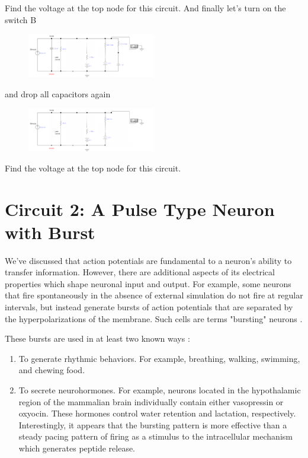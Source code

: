 \documentclass[12]{amsbook}
\newcommand\0{\mathbf{0}}
\newcommand\<{\langle}
\renewcommand\>{\rangle}
\begin{document}
Find the voltage at the top node for this circuit.
And finally let’s turn on the switch B
 
 \begin{figure}[H]
\includegraphics[width=0.5\textwidth]{exercise1-5}
\end{figure}

and drop all capacitors again
 
\begin{figure}[H]
\includegraphics[width=0.5\textwidth]{exercise1-6}
\end{figure}

Find the voltage at the top node for this circuit.


\section{Circuit 2: A Pulse Type Neuron with Burst}

We've discussed that action potentials are fundamental to a neuron's ability to transfer information. However, there are additional aspects of its electrical properties which shape neuronal input and output. For example, some neurons that fire spontaneously in the absence of external simulation do not fire at regular intervals, but instead generate bursts of action potentials that are separated by the hyperpolarizations of the membrane. Such cells are terms "bursting" neurons \cite{levitan2015neuron}.

These bursts are used in at least two known ways \cite{levitan2015neuron}:

\begin{enumerate}
\item To generate rhythmic behaviors. For example, breathing, walking, swimming, and chewing food.	
\item To secrete neurohormones. For example, neurons located in the hypothalamic region of the mammalian brain individually contain either vasopressin or oxyocin. These hormones control water retention and lactation, respectively. Interestingly, it appears that the bursting pattern is more effective than a steady pacing pattern of firing as a stimulus to the intracellular mechanism which generates peptide release.
\end{enumerate}
 
\end{document}
